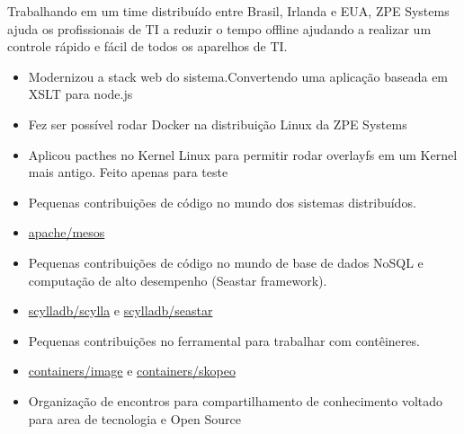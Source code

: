 \documentclass[10pt,a4paper]{altacv}
\begin{document}
Trabalhando em um time distribuído entre Brasil, Irlanda e EUA, ZPE Systems ajuda os profissionais de TI a reduzir o tempo offline ajudando a realizar um controle rápido e fácil de todos os aparelhos de TI.
\begin{itemize}
\item Modernizou a stack web do sistema.Convertendo uma aplicação baseada em XSLT para node.js 
\item Fez ser possível rodar Docker na distribuição Linux da ZPE Systems
\item Aplicou pacthes no Kernel Linux para permitir rodar overlayfs em um Kernel mais antigo. Feito apenas para teste
\end{itemize}

\divider


\begin{itemize}
\item Pequenas contribuições de código no mundo dos sistemas distribuídos.
\item \href{https://github.com/apache/mesos/commits/master?author=jvanz}{apache/mesos}
\end{itemize}
\begin{itemize}
\item Pequenas contribuições de código no mundo de base de dados NoSQL e computação de alto desempenho (Seastar framework).
\item \href{https://github.com/scylladb/scylla/commits/master?author=jvanz}{scylladb/scylla} e \href{https://github.com/scylladb/seastar/commits/master?author=jvanz}{scylladb/seastar}
\end{itemize}
\begin{itemize}
\item Pequenas contribuições no ferramental para trabalhar com contêineres.
\item \href{https://github.com/containers/image/commits?author=jvanz}{containers/image} e \href{https://github.com/containers/skopeo/commits?author=jvanz}{containers/skopeo}
\end{itemize}
\begin{itemize}
\item Organização de encontros para compartilhamento de conhecimento voltado para area de tecnologia e Open Source
\end{itemize}

\clearpage
\end{document}
